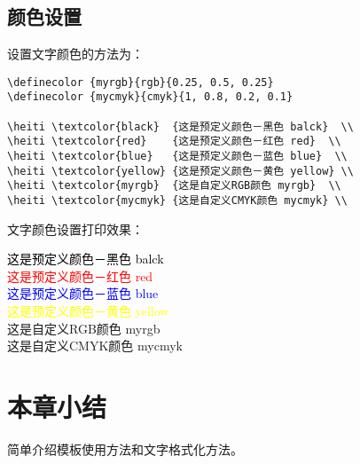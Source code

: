 \subsection{颜色设置}

设置文字颜色的方法为：
\begin{lstlisting}
\definecolor {myrgb}{rgb}{0.25, 0.5, 0.25}
\definecolor {mycmyk}{cmyk}{1, 0.8, 0.2, 0.1}

\heiti \textcolor{black}  {这是预定义颜色－黑色 balck}  \\
\heiti \textcolor{red}    {这是预定义颜色－红色 red}  \\
\heiti \textcolor{blue}   {这是预定义颜色－蓝色 blue}  \\
\heiti \textcolor{yellow} {这是预定义颜色－黄色 yellow} \\
\heiti \textcolor{myrgb}  {这是自定义RGB颜色 myrgb}  \\
\heiti \textcolor{mycmyk} {这是自定义CMYK颜色 mycmyk} \\
\end{lstlisting}


文字颜色设置打印效果：
\begin{flushleft}
  \xiaosan
  {

    \heiti \textcolor{black}  {这是预定义颜色－黑色 balck}  \\
    \heiti \textcolor{red}    {这是预定义颜色－红色 red}  \\
    \heiti \textcolor{blue}   {这是预定义颜色－蓝色 blue}  \\
    \heiti \textcolor{yellow} {这是预定义颜色－黄色 yellow} \\
    \heiti \textcolor{myrgb}  {这是自定义RGB颜色 myrgb}  \\
    \heiti \textcolor{mycmyk} {这是自定义CMYK颜色 mycmyk} \\
  }
\end{flushleft}

\section*{本章小结}
简单介绍模板使用方法和文字格式化方法。
